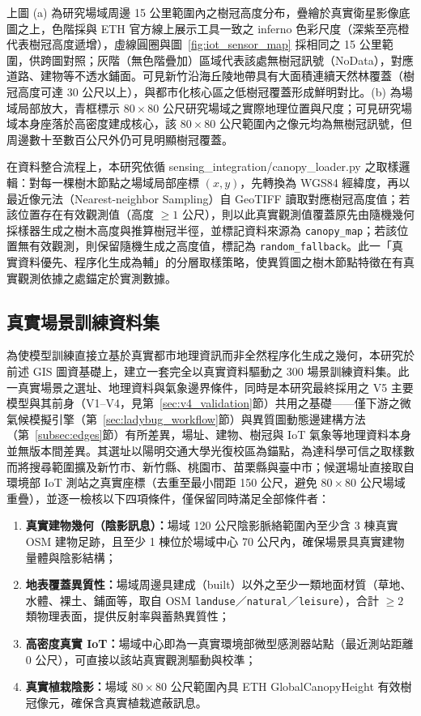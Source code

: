 上圖 (a) 為研究場域周邊 15 公里範圍內之樹冠高度分布，疊繪於真實衛星影像底圖之上，色階採與 ETH 官方線上展示工具一致之 inferno 色彩尺度（深紫至亮橙代表樹冠高度遞增），虛線圓圈與圖~\ref{fig:iot_sensor_map} 採相同之 15 公里範圍，供跨圖對照；灰階（無色階疊加）區域代表該處無樹冠訊號（NoData），對應道路、建物等不透水鋪面。可見新竹沿海丘陵地帶具有大面積連續天然林覆蓋（樹冠高度可達 30 公尺以上），與都市化核心區之低樹冠覆蓋形成鮮明對比。(b) 為場域局部放大，青框標示 $80\times80$ 公尺研究場域之實際地理位置與尺度；可見研究場域本身座落於高密度建成核心，該 $80\times80$ 公尺範圍內之像元均為無樹冠訊號，但周邊數十至數百公尺外仍可見明顯樹冠覆蓋。

在資料整合流程上，本研究依循 sensing\_integration/canopy\_loader.py 之取樣邏輯：對每一棵樹木節點之場域局部座標 $(x, y)$，先轉換為 WGS84 經緯度，再以最近像元法（Nearest-neighbor Sampling）自 GeoTIFF 讀取對應樹冠高度值；若該位置存在有效觀測值（高度 $\ge 1$ 公尺），則以此真實觀測值覆蓋原先由隨機幾何採樣器生成之樹木高度與推算樹冠半徑，並標記資料來源為 \texttt{canopy\_map}；若該位置無有效觀測，則保留隨機生成之高度值，標記為 \texttt{random\_fallback}。此一「真實資料優先、程序化生成為輔」的分層取樣策略，使異質圖之樹木節點特徵在有真實觀測依據之處錨定於實測數據。


\subsection{真實場景訓練資料集}
\label{subsec:v4_real_dataset}

為使模型訓練直接立基於真實都市地理資訊而非全然程序化生成之幾何，本研究於前述 GIS 圖資基礎上，建立一套完全以真實資料驅動之 300 場景訓練資料集。此一真實場景之選址、地理資料與氣象邊界條件，同時是本研究最終採用之 V5 主要模型與其前身（V1--V4，見第~\ref{sec:v4_validation}節）共用之基礎——僅下游之微氣候模擬引擎（第~\ref{sec:ladybug_workflow}節）與異質圖動態邊建構方法（第~\ref{subsec:edges}節）有所差異，場址、建物、樹冠與 IoT 氣象等地理資料本身並無版本間差異。其選址以陽明交通大學光復校區為錨點，為達科學可信之取樣數而將搜尋範圍擴及新竹市、新竹縣、桃園市、苗栗縣與臺中市；候選場址直接取自環境部 IoT 測站之真實座標（去重至最小間距 150 公尺，避免 $80\times80$ 公尺場域重疊），並逐一檢核以下四項條件，僅保留同時滿足全部條件者：

\begin{enumerate}
    \item \textbf{真實建物幾何（陰影訊息）：}場域 120 公尺陰影脈絡範圍內至少含 3 棟真實 OSM 建物足跡，且至少 1 棟位於場域中心 70 公尺內，確保場景具真實建物量體與陰影結構；
    \item \textbf{地表覆蓋異質性：}場域周邊具建成（built）以外之至少一類地面材質（草地、水體、裸土、鋪面等，取自 OSM \texttt{landuse}／\texttt{natural}／\texttt{leisure}），合計 $\ge 2$ 類物理表面，提供反射率與蓄熱異質性；
    \item \textbf{高密度真實 IoT：}場域中心即為一真實環境部微型感測器站點（最近測站距離 0 公尺），可直接以該站真實觀測驅動與校準；
    \item \textbf{真實植栽陰影：}場域 $80\times80$ 公尺範圍內具 ETH GlobalCanopyHeight 有效樹冠像元，確保含真實植栽遮蔽訊息。
\end{enumerate}

